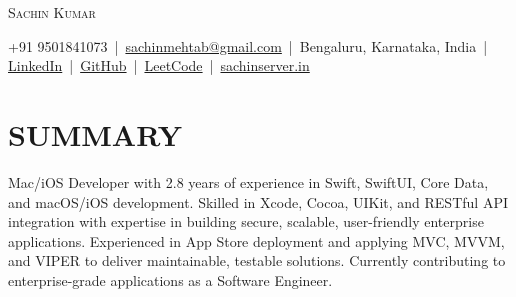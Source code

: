 \documentclass[letterpaper,11pt]{article}
\begin{document}
\begin{center}
{\Huge \scshape Sachin Kumar} \\ \vspace{6pt}

\small 
+91 9501841073 \,|\, 
\href{mailto:sachinmehtab@gmail.com}{sachinmehtab@gmail.com} \,|\, 
Bengaluru, Karnataka, India \,|\, 
\href{https://linkedin.com/in/sachinkumar6174}{LinkedIn} \,|\, 
\href{https://github.com/sachin6174}{GitHub} \,|\, 
\href{https://leetcode.com/u/sachinkumar6174/}{LeetCode} \,|\, 
\href{https://www.sachinserver.in}{sachinserver.in}
\end{center}

\vspace{-2pt}

\section{SUMMARY}
Mac/iOS Developer with 2.8 years of experience in Swift, SwiftUI, Core Data, and macOS/iOS development. Skilled in Xcode, Cocoa, UIKit, and RESTful API integration with expertise in building secure, scalable, user-friendly enterprise applications. Experienced in App Store deployment and applying MVC, MVVM, and VIPER to deliver maintainable, testable solutions. Currently contributing to enterprise-grade applications as a Software Engineer.

\end{document}
